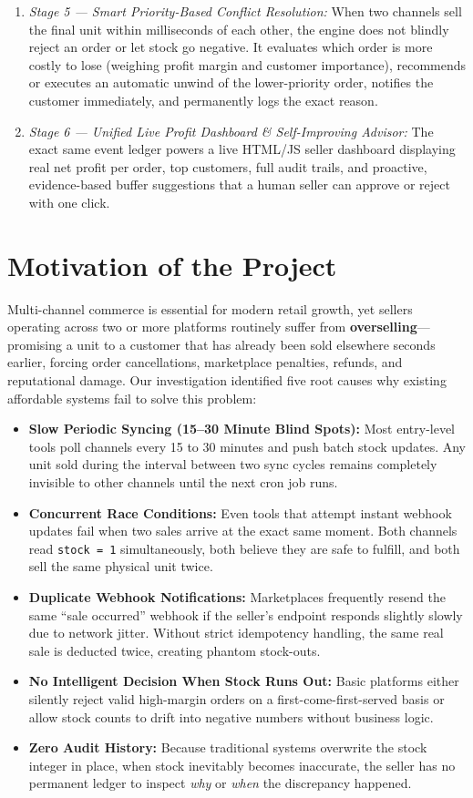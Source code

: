 \documentclass[oneside,a4paper,12pt]{report}
\begin{document}
\begin{itemize}
\begin{enumerate}
    \item \textit{Stage 5 — Smart Priority-Based Conflict Resolution:} When two channels sell the final unit within milliseconds of each other, the engine does not blindly reject an order or let stock go negative. It evaluates which order is more costly to lose (weighing profit margin and customer importance), recommends or executes an automatic unwind of the lower-priority order, notifies the customer immediately, and permanently logs the exact reason.
    \item \textit{Stage 6 — Unified Live Profit Dashboard \& Self-Improving Advisor:} The exact same event ledger powers a live HTML/JS seller dashboard displaying real net profit per order, top customers, full audit trails, and proactive, evidence-based buffer suggestions that a human seller can approve or reject with one click.
  \end{enumerate}
\end{itemize}

\section{Motivation of the Project}
Multi-channel commerce is essential for modern retail growth, yet sellers operating across two or more platforms routinely suffer from \textbf{overselling}—promising a unit to a customer that has already been sold elsewhere seconds earlier, forcing order cancellations, marketplace penalties, refunds, and reputational damage. Our investigation identified five root causes why existing affordable systems fail to solve this problem:
\begin{itemize}
  \item \textbf{Slow Periodic Syncing (15--30 Minute Blind Spots):} Most entry-level tools poll channels every 15 to 30 minutes and push batch stock updates. Any unit sold during the interval between two sync cycles remains completely invisible to other channels until the next cron job runs.
  \item \textbf{Concurrent Race Conditions:} Even tools that attempt instant webhook updates fail when two sales arrive at the exact same moment. Both channels read \texttt{stock = 1} simultaneously, both believe they are safe to fulfill, and both sell the same physical unit twice.
  \item \textbf{Duplicate Webhook Notifications:} Marketplaces frequently resend the same ``sale occurred'' webhook if the seller's endpoint responds slightly slowly due to network jitter. Without strict idempotency handling, the same real sale is deducted twice, creating phantom stock-outs.
  \item \textbf{No Intelligent Decision When Stock Runs Out:} Basic platforms either silently reject valid high-margin orders on a first-come-first-served basis or allow stock counts to drift into negative numbers without business logic.
  \item \textbf{Zero Audit History:} Because traditional systems overwrite the stock integer in place, when stock inevitably becomes inaccurate, the seller has no permanent ledger to inspect \textit{why} or \textit{when} the discrepancy happened.
\end{itemize}
\end{document}

